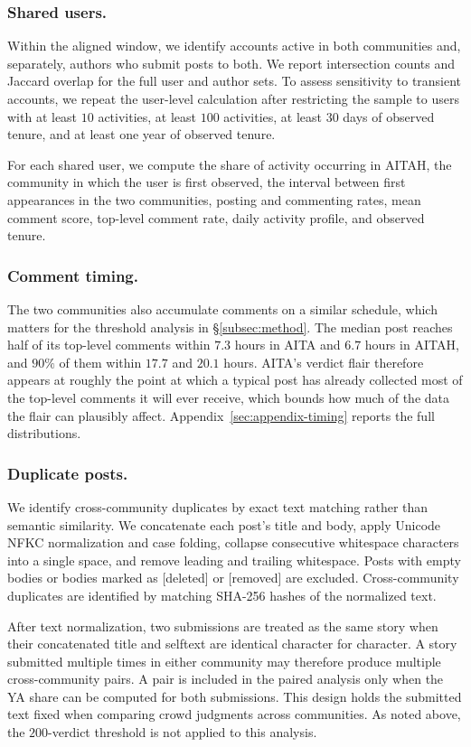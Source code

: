 \subsubsection{Shared users.}
Within the aligned window, we identify accounts active in both communities and,
separately, authors who submit posts to both. We report intersection counts and
Jaccard overlap for the full user and author sets. To assess sensitivity to
transient accounts, we repeat the user-level calculation after restricting the
sample to users with at least $10$ activities, at least $100$ activities, at
least $30$ days of observed tenure, and at least one year of observed tenure.

For each shared user, we compute the share of activity occurring in AITAH, the
community in which the user is first observed, the interval between first
appearances in the two communities, posting and commenting rates, mean comment
score, top-level comment rate, daily activity profile, and observed tenure.

\subsubsection{Comment timing.}
The two communities also accumulate comments on a similar schedule, which
matters for the threshold analysis in \S\ref{subsec:method}. The median post
reaches half of its top-level comments within $7.3$ hours in AITA and $6.7$
hours in AITAH, and $90\%$ of them within $17.7$ and $20.1$ hours. AITA's
verdict flair therefore appears at roughly the point at which a typical post
has already collected most of the top-level comments it will ever receive,
which bounds how much of the data the flair can plausibly affect.
Appendix~\ref{sec:appendix-timing} reports the full distributions.

\subsubsection{Duplicate posts.}
We identify cross-community duplicates by exact text matching rather than
semantic similarity. We concatenate each post's title and body, apply Unicode NFKC normalization and case folding, collapse consecutive whitespace characters into a single space, and remove leading and
trailing whitespace. Posts with empty bodies or bodies marked as [deleted] or [removed] are excluded. Cross-community duplicates are identified by matching SHA-256 hashes of the normalized text.

After text normalization,
two submissions are treated as the same story when their concatenated title and
selftext are identical character for character. A story submitted multiple
times in either community may therefore produce multiple cross-community pairs.
A pair is included in the paired analysis only when the YA share can be computed
for both submissions. This design holds the submitted text fixed when comparing
crowd judgments across communities. As noted above, the $200$-verdict threshold
is not applied to this analysis.



